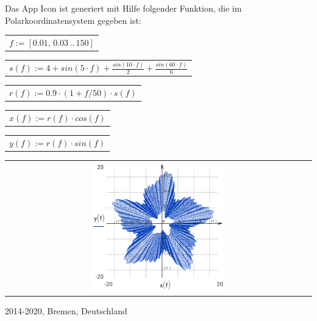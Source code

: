 \documentclass[DIV=calc, paper=a4, fontsize=11pt, twocolumn]{scrartcl}
\begin{document}
Das App Icon ist generiert mit Hilfe
folgender Funktion, die im
Polarkoordinatensystem gegeben ist:
\begin{center}\begin{tabular}{c}
  $f := \left[ 0.01,\, 0.03 \,..\, 150 \right]$
\end{tabular}\end{center}
\begin{center}\begin{tabular}{c}
  $s(f) := 4 + sin \left( 5 \cdot f\right)  + \frac{sin \left( 10 \cdot f\right) }{2} + \frac{sin \left( 60 \cdot f\right) }{6}$
\end{tabular}\end{center}
\begin{center}\begin{tabular}{c}
  $r(f) := 0.9 \cdot \left( 1 + f / 50 \right) \cdot s \left( f\right) $
\end{tabular}\end{center}
\begin{center}\begin{tabular}{c}
  $x(f) := r \left( f\right)  \cdot cos \left( f\right) $
\end{tabular}\end{center}
\begin{center}\begin{tabular}{c}
  $y(f) := r \left( f\right)  \cdot sin \left( f\right) $
\end{tabular}\end{center}
\begin{center}\begin{tabular}{c} \includegraphics[width=0.45\textwidth]{graphics/about_micromath_fig1.png} \end{tabular}\end{center}

2014-2020, Bremen, Deutschland
\end{document}
